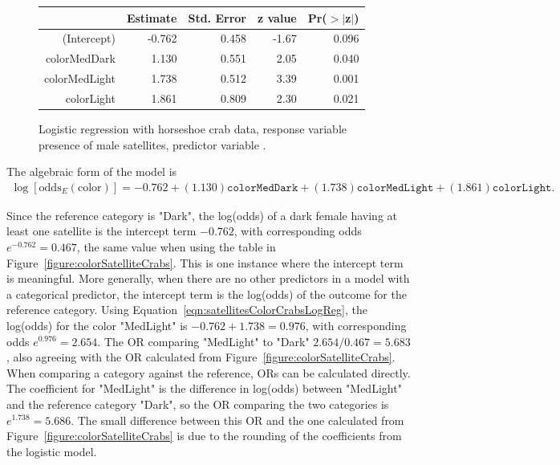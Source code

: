 \begin{figure}[ht]
\centering
\begin{tabular}{rrrrr}
  \hline
 & Estimate & Std. Error & z value & Pr($>$$|$z$|$) \\
  \hline
(Intercept) & -0.762 & 0.458 & -1.67 & 0.096 \\
  colorMedDark & 1.130 & 0.551 & 2.05 & 0.040 \\
  colorMedLight & 1.738 & 0.512 & 3.39 & 0.001 \\
  colorLight & 1.861 & 0.809 & 2.30 & 0.021 \\
   \hline
\end{tabular}
\caption{Logistic regression with horseshoe crab data, response variable
       presence of male satellites, predictor variable .}
\label{figure:satellitesColorCrabsLogReg}
\end{figure}


The algebraic form of the model is
\begin{align}
\log\left[\text{odds}_{E}(\text{color})\right] = -0.762 + (1.130)\texttt{colorMedDark}
 + (1.738)\texttt{colorMedLight} + (1.861)\texttt{colorLight}.
 \label{eqn:satellitesColorCrabsLogReg}
\end{align}

Since the reference category is "Dark", the log(odds) of a dark female having at least one satellite is the intercept term $-0.762$, with corresponding odds $e^{-0.762} = 0.467$, the same value when using the table in Figure~\ref{figure:colorSatelliteCrabs}. This is one instance where the intercept term is meaningful. More generally, when there are no other predictors in a model with a categorical predictor, the intercept term is the log(odds) of the outcome for the reference category. Using Equation~\ref{eqn:satellitesColorCrabsLogReg}, the log(odds) for the color "MedLight" is $-0.762 + 1.738 = 0.976$, with corresponding odds $e^{0.976} = 2.654$. The OR comparing "MedLight" to "Dark" $2.654/0.467 = 5.683$, also agreeing with the OR calculated from Figure~\ref{figure:colorSatelliteCrabs}.  When comparing a category against the reference, ORs can be calculated directly.  The coefficient for "MedLight" is the difference in log(odds) between "MedLight" and the reference category "Dark", so the OR comparing the two categories is $e^{1.738} = 5.686$.  The small difference between this OR and the one calculated from Figure~\ref{figure:colorSatelliteCrabs} is due to the rounding of the coefficients from the logistic model.

